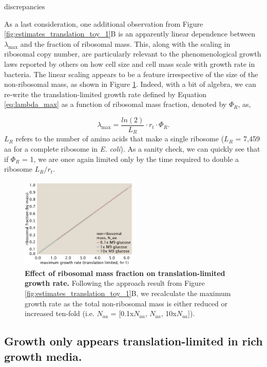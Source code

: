 discrepancies \documentclass[11pt, letterpaper]{article}
\begin{document}
As a last consideration, one additional observation from Figure \ref{fig:estimates_translation_toy_1}B
is an apparently linear dependence
between $\lambda_{\text{max}}$  and the fraction of ribosomal mass. This, along with the
scaling in ribosomal copy number, are particularly relevant to the
phenomenological growth laws reported by others on how cell size and cell mass
scale with growth rate in bacteria. The linear scaling appears to be a feature
irrespective of the size of the non-ribosomal mass, as shown in Figure
\ref{fig:estimates_translation_ribo_frac}. Indeed, with a bit of algebra, we can
re-write the translation-limited growth rate defined by Equation
\ref{eq:lambda_max} as a function of ribosomal mass fraction, denoted by
$\Phi_R$, as,

\begin{equation}
\lambda_{\text{max}} =  \frac{ln(2)} {L_R} \cdot r_t \cdot \Phi_R.
\label{eq:lambda_max_phi}
\end{equation}
$L_R$ refers to the number of amino acids that make a single
ribosome ($L_R$ = 7,459 aa for a complete ribosome in {\it E. coli}). As a sanity check, we can quickly
see that if $\Phi_R$ = 1, we are once again limited only by the time required to
double a ribosome $L_R / r_t$.

\begin{figure}[H]
		\centering
    \includegraphics[width=0.5\textwidth]{../../code/figures/SI/estimates_translation_ribo_frac.pdf}
  \caption{{\bf Effect of ribosomal mass fraction on translation-limited growth rate.} Following the approach
	result from Figure \ref{fig:estimates_translation_toy_1}B, we recalculate the maximum growth rate as
	the total non-ribosomal mass is either reduced or increased ten-fold (i.e. $N_{aa}$ = [0.1x$N_{aa}$, $N_{aa}$, 10x$N_{aa}$]).}
  \label{fig:estimates_translation_ribo_frac}
\end{figure}


\subsection{Growth only appears translation-limited in rich growth media.}
\end{document}
